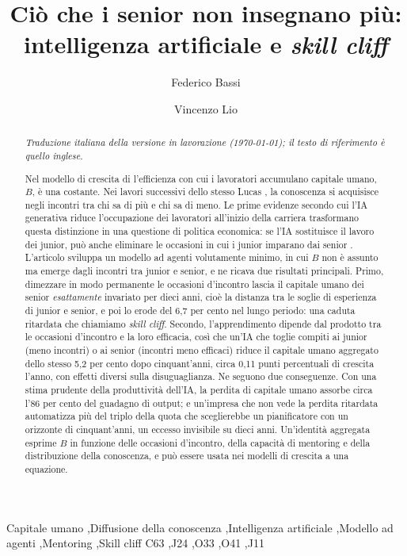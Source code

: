 \documentclass[preprint,12pt,authoryear]{elsarticle}
\newcommand{\todo}[1]{\textcolor{red}{[#1]}}
\begin{document}
\begin{frontmatter}

\title{Ciò che i senior non insegnano più: intelligenza artificiale e \emph{skill cliff}}

\author[aff1]{Federico Bassi}
\author[aff2]{Vincenzo Lio}
\affiliation[aff1]{organization={\todo{Affiliazione}},country={\todo{Paese}}}
\affiliation[aff2]{organization={\todo{Affiliazione}},country={Italia}}

\begin{abstract}
\emph{Traduzione italiana della versione in lavorazione (\today); il testo di riferimento è quello inglese.}

\smallskip
Nel modello di crescita di \citet{Lucas1988} l'efficienza con cui i lavoratori accumulano capitale umano, $B$, è una costante. Nei lavori successivi dello stesso Lucas \citep{Lucas2009,LucasMoll2014}, la conoscenza si acquisisce negli incontri tra chi sa di più e chi sa di meno. Le prime evidenze secondo cui l'IA generativa riduce l'occupazione dei lavoratori all'inizio della carriera \citep{Brynjolfsson2025,HosseiniLichtinger2025} trasformano questa distinzione in una questione di politica economica: se l'IA sostituisce il lavoro dei junior, può anche eliminare le occasioni in cui i junior imparano dai senior \citep{Ide2026}. L'articolo sviluppa un modello ad agenti volutamente minimo, in cui $B$ non è assunto ma emerge dagli incontri tra junior e senior, e ne ricava due risultati principali. Primo, dimezzare in modo permanente le occasioni d'incontro lascia il capitale umano dei senior \emph{esattamente} invariato per dieci anni, cioè la distanza tra le soglie di esperienza di junior e senior, e poi lo erode del 6,7 per cento nel lungo periodo: una caduta ritardata che chiamiamo \emph{skill cliff}. Secondo, l'apprendimento dipende dal prodotto tra le occasioni d'incontro e la loro efficacia, così che un'IA che toglie compiti ai junior (meno incontri) o ai senior (incontri meno efficaci) riduce il capitale umano aggregato dello stesso 5,2 per cento dopo cinquant'anni, circa 0,11 punti percentuali di crescita l'anno, con effetti diversi sulla disuguaglianza. Ne seguono due conseguenze. Con una stima prudente della produttività dell'IA, la perdita di capitale umano assorbe circa l'86 per cento del guadagno di output; e un'impresa che non vede la perdita ritardata automatizza più del triplo della quota che sceglierebbe un pianificatore con un orizzonte di cinquant'anni, un eccesso invisibile su dieci anni. Un'identità aggregata esprime $B$ in funzione delle occasioni d'incontro, della capacità di mentoring e della distribuzione della conoscenza, e può essere usata nei modelli di crescita a una equazione.
\end{abstract}

\begin{keyword}
Capitale umano \sep Diffusione della conoscenza \sep Intelligenza artificiale \sep Modello ad agenti \sep Mentoring \sep Skill cliff
\JEL C63 \sep J24 \sep O33 \sep O41 \sep J11
\end{keyword}

\end{frontmatter}
\end{document}
